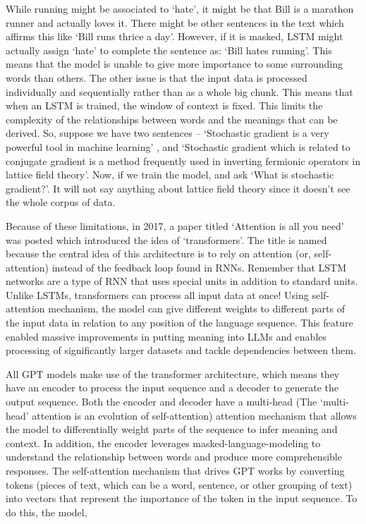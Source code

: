 \documentclass[11pt]{article}
\begin{document}
While running might be associated to `hate', it might be that Bill is a marathon runner and actually loves it. There might be other sentences in the text
which affirms this like `Bill runs thrice a day'. However, if it is masked, LSTM might actually assign `hate' to complete the sentence as:
`Bill hates running'. This means that the model is unable to give more importance to some surrounding words than others. 
The other issue is that the input data is processed individually and sequentially rather than as a whole big chunk. 
This means that when an LSTM is trained, the window of context is fixed. This limits the complexity of the relationships between words and the meanings that can be derived.
So, suppose we have two sentences -- `Stochastic gradient is a very powerful tool in machine learning' , and `Stochastic gradient which is related to conjugate gradient 
is a method frequently used in inverting fermionic operators in lattice field theory'. Now, if we train the model, and ask `What is stochastic gradient?'. It will not 
say anything about lattice field theory since it doesn't see the whole corpus of data. 


Because of these limitations, in 2017, a paper titled `Attention is all you need' was posted which introduced the idea of `transformers'. 
The title is named because the central idea of this architecture is to rely on attention (or, self-attention) 
instead of the feedback loop found in RNNs. Remember that 
LSTM networks are a type of RNN that uses special units in addition to standard units. 
Unlike LSTMs, transformers can process all input data at once! 
Using self-attention mechanism, the model can give different 
weights to different parts of the input data in relation to any position of the language sequence. 
This feature enabled massive improvements in putting meaning into LLMs 
and enables processing of significantly larger datasets and tackle dependencies between them. 


All GPT models make use of 
the transformer architecture, which means they have an encoder to process the input sequence and a decoder to generate the output sequence. 
Both the encoder and decoder have a multi-head (The ‘multi-head’ attention is an evolution of self-attention) attention mechanism that allows the model to differentially weight parts of the sequence to infer meaning and context. 
In addition, the encoder leverages masked-language-modeling to understand the relationship between words and produce more comprehensible responses.
The self-attention mechanism that drives GPT works by converting tokens (pieces of text, which can be a word, sentence, or other grouping of text) into vectors that represent the importance of the token in the input sequence. 
To do this, the model,
\end{document}
